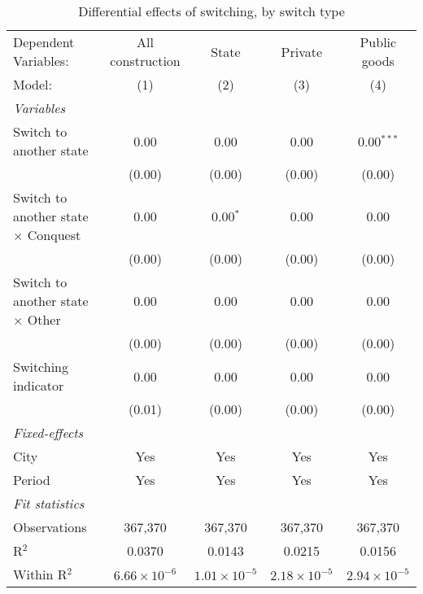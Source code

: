 \begin{table}[htbp]
   \caption{\label{tab:baseline_1y} Differential effects of switching, by switch type}
   \centering
   \begin{tabular}{lcccc}
      \tabularnewline \midrule \midrule
      Dependent Variables:                       & All construction      & State                 & Private               & Public goods\\  
      Model:                                     & (1)                   & (2)                   & (3)                   & (4)\\  
      \midrule
      \emph{Variables}\\
      Switch to another state                    & 0.00                  & 0.00                  & 0.00                  & 0.00$^{***}$\\   
                                                 & (0.00)                & (0.00)                & (0.00)                & (0.00)\\   
      Switch to another state $\times$ Conquest  & 0.00                  & 0.00$^{*}$            & 0.00                  & 0.00\\   
                                                 & (0.00)                & (0.00)                & (0.00)                & (0.00)\\   
      Switch to another state $\times$ Other     & 0.00                  & 0.00                  & 0.00                  & 0.00\\   
                                                 & (0.00)                & (0.00)                & (0.00)                & (0.00)\\   
      Switching indicator                        & 0.00                  & 0.00                  & 0.00                  & 0.00\\   
                                                 & (0.01)                & (0.00)                & (0.00)                & (0.00)\\   
      \midrule
      \emph{Fixed-effects}\\
      City                                       & Yes                   & Yes                   & Yes                   & Yes\\  
      Period                                     & Yes                   & Yes                   & Yes                   & Yes\\  
      \midrule
      \emph{Fit statistics}\\
      Observations                               & 367,370               & 367,370               & 367,370               & 367,370\\  
      R$^2$                                      & 0.0370                & 0.0143                & 0.0215                & 0.0156\\  
      Within R$^2$                               & $6.66\times 10^{-6}$  & $1.01\times 10^{-5}$  & $2.18\times 10^{-5}$  & $2.94\times 10^{-5}$\\   
      \midrule \midrule
      

\end{tabular}
\end{table}
